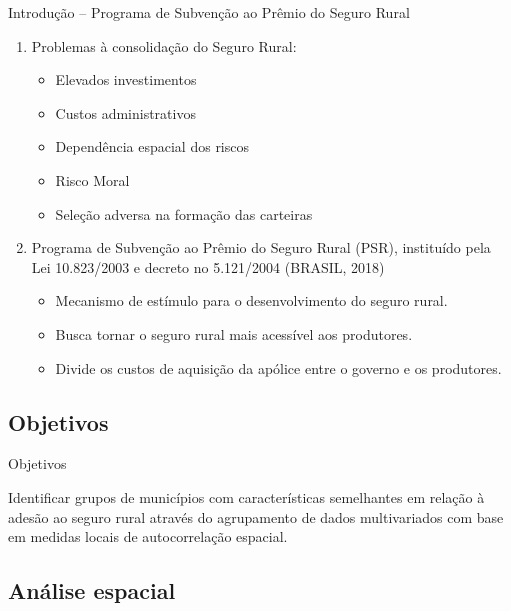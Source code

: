 \documentclass[aspectratio=169]{beamer}
\begin{document}
\begin{frame}{Introdução -- Programa de Subvenção ao Prêmio do Seguro Rural}
    \begin{enumerate}
        \item Problemas à consolidação do Seguro Rural:
            \begin{itemize}
                \item Elevados investimentos
                \item Custos administrativos
                \item Dependência espacial dos riscos
                \item Risco Moral
                \item Seleção adversa na formação das carteiras
            \end{itemize}
        \vspace{0.25cm}
        \item Programa de Subvenção ao Prêmio do Seguro Rural (PSR), instituído pela Lei 10.823/2003 e decreto no 5.121/2004
		(BRASIL, 2018)
            \begin{itemize}
                \item Mecanismo de estímulo para o desenvolvimento do seguro rural.
                \item Busca tornar o seguro rural mais acessível aos produtores.
                \item Divide os custos de aquisição da apólice entre o governo e os produtores. 
            \end{itemize}
    \end{enumerate}
\end{frame}


\subsection{Objetivos}

\begin{frame}{Objetivos} 
	\begin{block}{}
	    Identificar grupos de municípios com características semelhantes em relação à adesão ao seguro rural através do agrupamento de dados multivariados com base em medidas locais de autocorrelação espacial.
	\end{block}
\end{frame}

\subsection{Análise espacial}
\end{document}
